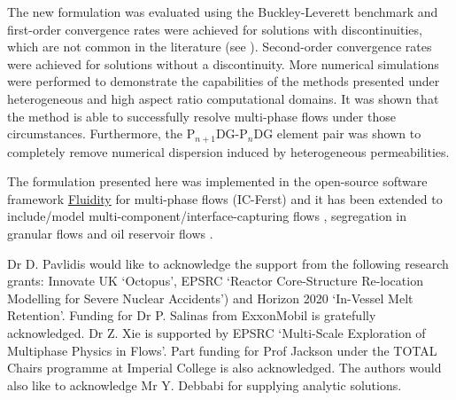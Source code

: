 \documentclass[times]{fldauth}
\newcommand{\PN}[2][error]{P$_{#1}$DG-P$_{#2}$}
\begin{document}
The new formulation was evaluated using the Buckley-Leverett benchmark
and first-order convergence rates were achieved for solutions with
discontinuities, which are not common in the literature
(see \cite{Schmid,Hoteit}). Second-order convergence rates were
achieved for solutions without a discontinuity. More numerical
simulations were performed to demonstrate the capabilities of the
methods presented under heterogeneous and high aspect ratio
computational domains. It was shown that the method is able to 
successfully resolve multi-phase flows under those circumstances. Furthermore,
the \PN[n+1]{n}DG element pair was shown to completely remove
numerical dispersion induced by heterogeneous permeabilities.

The formulation presented here was implemented in the open-source
software framework
\href{http://www3.imperial.ac.uk/earthscienceandengineering/research/amcg/fluidity}{Fluidity}
for multi-phase flows (IC-Ferst) and it has been extended to
include/model multi-component/interface-capturing flows
\cite{pavlidis_2013b,pavlidis_2014,xie_2014}, segregation in granular
flows \cite{percival_2014} and oil reservoir flows
\cite{jackson_2015,mostaghimi_2015, Salinas}.



\ack Dr D. Pavlidis would like to acknowledge the support from the
following research grants: Innovate UK `Octopus', EPSRC `Reactor
Core-Structure Re-location Modelling for Severe Nuclear Accidents')
and Horizon 2020 `In-Vessel Melt Retention'. Funding for Dr P. Salinas
from ExxonMobil is gratefully acknowledged. Dr Z. Xie is supported by
EPSRC `Multi-Scale Exploration of Multiphase Physics in Flows'. Part
funding for Prof Jackson under the TOTAL Chairs programme at Imperial
College is also acknowledged. The authors would also like to acknowledge
Mr Y. Debbabi for supplying analytic solutions.





\end{document}
